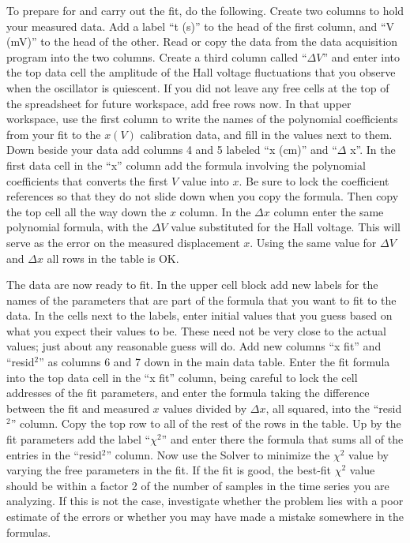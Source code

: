 \documentclass{revtex4}
\begin{document}
To prepare for and carry out the fit, do the following.  Create two columns
to hold your measured data.  Add a label ``t (s)'' to the head of the first
column, and ``V (mV)'' to the head of the other.  Read or copy the data from
the data acquisition program into the two columns.  Create a third column
called ``$\Delta V$'' and enter into the top data cell the amplitude of
the Hall voltage fluctuations that you observe when the oscillator is
quiescent.  If you did not leave any free cells at the top of the spreadsheet
for future workspace, add free rows now.  In that upper workspace, use the
first column to write the names of the polynomial coefficients from your
fit to the $x(V)$ calibration data, and fill in the values next to them.
Down beside your data add columns 4 and 5 labeled ``x (cm)'' and
``$\Delta$ x''.  In the first data cell in the ``x'' column add the formula
involving the polynomial coefficients that converts the first $V$ value into
$x$.  Be sure to lock the coefficient references so that they do not slide
down when you copy the formula.  Then copy the top cell all the way down the
$x$ column.  In the $\Delta x$ column enter the same polynomial formula,
with the $\Delta V$ value substituted for the Hall voltage.  This will
serve as the error on the measured displacement $x$.  Using the same value
for $\Delta V$ and $\Delta x$ all rows in the table is OK.

The data are now ready to fit.  In the upper cell block add new labels for
the names of the parameters that are part of the formula that you want to
fit to the data.  In the cells next to the labels, enter initial values that
you guess based on what you expect their values to be.  These need not be
very close to the actual values; just about any reasonable guess will do.
Add new columns ``x fit'' and ``resid$^2$'' as columns 6 and 7 down in the main
data table.  Enter the fit formula into the top data cell in the ``x fit''
column, being careful to lock the cell addresses of the fit parameters,
and enter the formula taking the difference between the fit and measured $x$
values divided by $\Delta x$, all squared, into the ``resid$^2$'' column. 
Copy the top row to all of the rest of the rows in the table.  Up by the
fit parameters add the label ``$\chi^2$'' and enter there the formula that
sums all of the entries in the ``resid$^2$'' column.  Now use the Solver
to minimize the $\chi^2$ value by varying the free parameters in the fit.
If the fit is good, the best-fit $\chi^2$ value should be within a factor
2 of the number of samples in the time series you are analyzing.  If this
is not the case, investigate whether the problem lies with a poor estimate
of the errors or whether you may have made a mistake somewhere in the
formulas.
\end{document}
